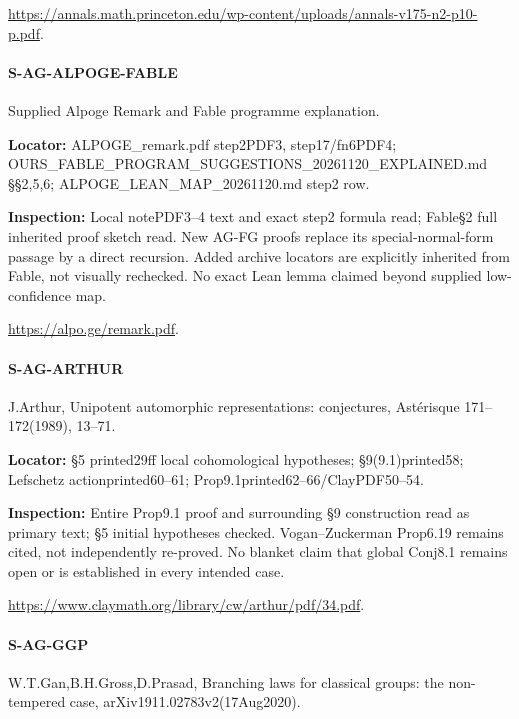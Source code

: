 \documentclass[11pt,a4paper]{article}
\begin{document}
\url{https://annals.math.princeton.edu/wp-content/uploads/annals-v175-n2-p10-p.pdf}.

\paragraph{S-AG-ALPOGE-FABLE} Supplied Alpoge Remark and Fable programme explanation.

\textbf{Locator:} ALPOGE\_\allowbreak{}remark.\allowbreak{}pdf step2PDF3, step17/\allowbreak{}fn6PDF4; OURS\_\allowbreak{}FABLE\_\allowbreak{}PROGRAM\_\allowbreak{}SUGGESTIONS\_\allowbreak{}20261120\_\allowbreak{}EXPLAINED.\allowbreak{}md §§2,5,6; ALPOGE\_\allowbreak{}LEAN\_\allowbreak{}MAP\_\allowbreak{}20261120.\allowbreak{}md step2 row.

\textbf{Inspection:} Local notePDF3–\allowbreak{}4 text and exact step2 formula read; Fable§2 full inherited proof sketch read.\allowbreak{} New AG-FG proofs replace its special-normal-form passage by a direct recursion.\allowbreak{} Added archive locators are explicitly inherited from Fable, not visually rechecked.\allowbreak{} No exact Lean lemma claimed beyond supplied low-confidence map.\allowbreak{}

\url{https://alpo.ge/remark.pdf}.

\paragraph{S-AG-ARTHUR} J.\allowbreak{}Arthur, Unipotent automorphic representations:\allowbreak{} conjectures, Astérisque 171–\allowbreak{}172(1989), 13–\allowbreak{}71.

\textbf{Locator:} §5 printed29ff local cohomological hypotheses; §9(9.\allowbreak{}1)printed58; Lefschetz actionprinted60–\allowbreak{}61; Prop9.\allowbreak{}1printed62–\allowbreak{}66/\allowbreak{}ClayPDF50–\allowbreak{}54.

\textbf{Inspection:} Entire Prop9.\allowbreak{}1 proof and surrounding §9 construction read as primary text; §5 initial hypotheses checked.\allowbreak{} Vogan–\allowbreak{}Zuckerman Prop6.\allowbreak{}19 remains cited, not independently re-proved.\allowbreak{} No blanket claim that global Conj8.\allowbreak{}1 remains open or is established in every intended case.\allowbreak{}

\url{https://www.claymath.org/library/cw/arthur/pdf/34.pdf}.

\paragraph{S-AG-GGP} W.\allowbreak{}T.\allowbreak{}Gan,B.\allowbreak{}H.\allowbreak{}Gross,D.\allowbreak{}Prasad, Branching laws for classical groups:\allowbreak{} the non-tempered case, arXiv1911.\allowbreak{}02783v2(17Aug2020).
\end{document}
